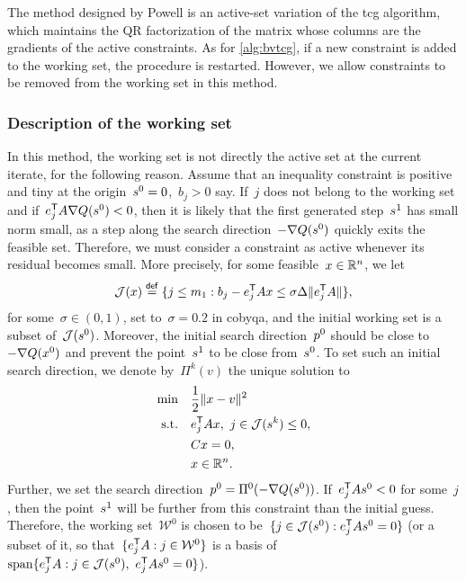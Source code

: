 The method designed by Powell is an active-set variation of the \gls{tcg} algorithm, which maintains the QR factorization of the matrix whose columns are the gradients of the active constraints.
As for \cref{alg:bvtcg}, if a new constraint is added to the working set, the procedure is restarted.
However, we allow constraints to be removed from the working set in this method.

\subsubsection{Description of the working set}

In this method, the working set is not directly the active set at the current iterate, for the following reason.
Assume that an inequality constraint is positive and tiny at the origin~$\sstep[0] = 0$,~$b_j > 0$ say.
If~$j$ does not belong to the working set and if~$e_j^{\T} A \nabla Q(\sstep[0]) < 0$, then it is likely that the first generated step~$\sstep[1]$ has small norm small, as a step along the search direction~$-\nabla Q(\sstep[0])$ quickly exits the feasible set.
Therefore, we must consider a constraint as active whenever its residual becomes small.
More precisely, for some feasible~$\iter \in \R^n$, we let
\begin{equation*}
    \mathcal{J}(\iter) \eqdef \set{j \le m_1 : b_j - e_j^{\T} A \iter \le \sigma \rad \norm{e_j^{\T} A}},
\end{equation*}
for some~$\sigma \in (0, 1)$, set to~$\sigma = 0.2$ in \gls{cobyqa}, and the initial working set is a subset of~$\mathcal{J}(\sstep[0])$.
Moreover, the initial search direction~$\pstep[0]$ should be close to~$-\nabla Q(\iter[0])$ and prevent the point~$\sstep[1]$ to be close from~$\sstep[0]$.
To set such an initial search direction, we denote by~$\Pi^k(v)$ the unique solution to
\begin{subequations}
    \label{eq:tcg-linear-working-set}
    \begin{align}
        \min        & \quad \frac{1}{2} \norm{\iter - v}^2\\
        \text{s.t.} & \quad e_j^{\T} A \iter, ~ j \in \mathcal{J}(\sstep[k]) \le 0,\\
                    & \quad C \iter = 0,\\
                    & \quad \iter \in \R^n. \nonumber
    \end{align}
\end{subequations}
Further, we set the search direction~$\pstep[0] = \Pi^0(-\nabla Q(\sstep[0]))$.
If~$e_j^{\T} A \sstep[0] < 0$ for some~$j$, then the point~$\sstep[1]$ will be further from this constraint than the initial guess.
Therefore, the working set~$\mathcal{W}^0$ is chosen to be~$\set{j \in \mathcal{J}(\sstep[0]) : e_j^{\T} A \sstep[0] = 0}$ (or a subset of it, so that~$\{e_j^{\mathsf{T}} A : j \in \mathcal{W}^0\}$ is a basis of~$\vspan \set{e_j^{\T} A : j \in \mathcal{J}(\sstep[0]), ~ e_j^{\T} A \sstep[0] = 0}$).

